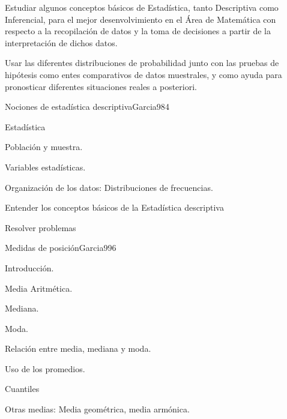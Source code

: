 \begin{syllabus}


\begin{goals}
\item  Estudiar algunos conceptos básicos de Estadística, tanto Descriptiva como Inferencial, para el mejor desenvolvimiento en el Área de Matemática con respecto a la recopilación de datos y la toma de decisiones a partir de la interpretación de dichos datos.
\item  Usar las diferentes distribuciones de probabilidad junto con las pruebas de hipótesis como entes comparativos de datos muestrales, y como ayuda para pronosticar diferentes situaciones reales a posteriori.
\end{goals}

\begin{outcomes}
\end{outcomes}

\begin{unit}{Nociones de estadística descriptiva}{Garcia98}{4}
   \begin{topics}
         \item  Estadística
	 \item  Población y muestra.
	 \item  Variables estadísticas.
         \item  Organización de los datos: Distribuciones de frecuencias.
   \end{topics}

   \begin{unitgoals}
         \item  Entender los conceptos básicos de la Estadística descriptiva
         \item  Resolver problemas
   \end{unitgoals}
\end{unit}

\begin{unit}{Medidas de posición}{Garcia99}{6}
   \begin{topics}
	\item Introducción.
	\item Media Aritmética.
	\item Mediana.
	\item Moda.
	\item Relación entre media, mediana y moda.
	\item Uso de los promedios.
	\item Cuantiles
	\item Otras medias: Media geométrica, media armónica.
   \end{topics}


\end{unit}
\end{syllabus}
